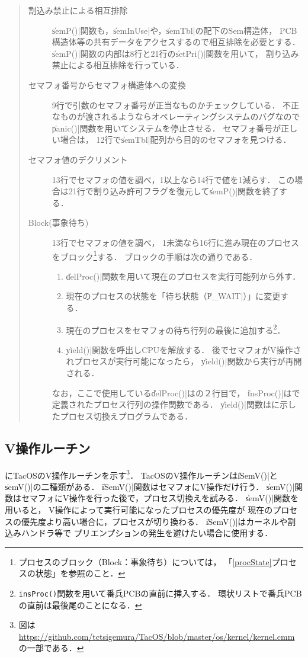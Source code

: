 \begin{quote}
\begin{description}
\item [割込み禁止による相互排除]
\|semP()|関数も，\|semInUse|や，\|semTbl|の配下のSem構造体，
PCB構造体等の共有データをアクセスするので相互排除を必要とする．
\|semP()|関数の内部は8行と21行の\|setPri()|関数を用いて，
割り込み禁止による相互排除を行っている．

\item [セマフォ番号からセマフォ構造体への変換]
9行で引数のセマフォ番号が正当なものかチェックしている．
不正なものが渡されるようならオペレーティングシステムのバグなので
\|panic()|関数を用いてシステムを停止させる．
セマフォ番号が正しい場合は，
12行で\|semTbl|配列から目的のセマフォを見つける．

\item [セマフォ値のデクリメント]
13行でセマフォの値を調べ，1以上なら14行で値を1減らす．
この場合は21行で割り込み許可フラグを復元して\|semP()|関数を終了する．

\item [Block(事象待ち)]
13行でセマフォの値を調べ，
1未満なら16行に進み現在のプロセスをブロック\footnote{
プロセスのブロック（Block：事象待ち）については，
「\ref{procState}プロセスの状態」を参照のこと．}する．
ブロックの手順は次の通りである．

\begin{enumerate}
\item \|delProc()|関数を用いて現在のプロセスを実行可能列から外す．
\item 現在のプロセスの状態を「待ち状態（\|P_WAIT|）」に変更する．
\item 現在のプロセスをセマフォの待ち行列の最後に追加する\footnote{
{\tt insProc()}関数を用いて番兵PCBの直前に挿入する．
環状リストで番兵PCBの直前は最後尾のことになる．}．
\item \|yield()|関数を呼出しCPUを解放する．
後でセマフォがV操作されプロセスが実行可能になったら，
\|yield()|関数から実行が再開される．
\end{enumerate}

なお，ここで使用している\|delProc()|はの２行目で，
\|insProc()|はで定義されたプロセス行列の操作関数である．
\|yield()|関数はに示したプロセス切換えプログラムである．
\end{description}
\end{quote}

\subsection{V操作ルーチン}
にTacOSのV操作ルーチンを示す\footnote{図は
\url{https://github.com/tctsigemura/TacOS/blob/master/os/kernel/kernel.cmm}
の一部である．}．
TacOSのV操作ルーチンは\|iSemV()|と\|semV()|の二種類がある．
\|iSemV()|関数はセマフォにV操作だけ行う．
\|semV()|関数はセマフォにV操作を行った後で，プロセス切換えを試みる．
\|semV()|関数を用いると，
V操作によって実行可能になったプロセスの優先度が
現在のプロセスの優先度より高い場合に，プロセスが切り換わる．
\|iSemV()|はカーネルや割込みハンドラ等で
プリエンプションの発生を避けたい場合に使用する．

